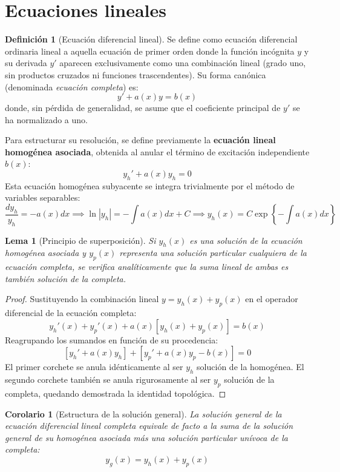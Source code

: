 \documentclass[11pt,a4paper]{article}
\theoremstyle{definition}
\newtheorem{definition}{Definición}[section]
\theoremstyle{plain}
\newtheorem{corollary}{Corolario}[section]
\newtheorem{lemma}{Lema}[section]
\begin{document}
\section{Ecuaciones lineales}

\begin{definition}[Ecuación diferencial lineal]
Se define como ecuación diferencial ordinaria lineal a aquella ecuación de primer orden donde la función incógnita $y$ y su derivada $y'$ aparecen exclusivamente como una combinación lineal (grado uno, sin productos cruzados ni funciones trascendentes). Su forma canónica (denominada \textit{ecuación completa}) es:
$$ y' + a(x)y = b(x) $$
donde, sin pérdida de generalidad, se asume que el coeficiente principal de $y'$ se ha normalizado a uno.
\end{definition}

Para estructurar su resolución, se define previamente la \textbf{ecuación lineal homogénea asociada}, obtenida al anular el término de excitación independiente $b(x)$:
$$ y_h' + a(x)y_h = 0 $$
Esta ecuación homogénea subyacente se integra trivialmente por el método de variables separables:
$$ \frac{dy_h}{y_h} = -a(x)dx \implies \ln|y_h| = -\int a(x)dx + C \implies y_h(x) = C \exp\left\{ -\int a(x)dx \right\} $$

\begin{lemma}[Principio de superposición]
Si $y_h(x)$ es una solución de la ecuación homogénea asociada y $y_p(x)$ representa una solución particular cualquiera de la ecuación completa, se verifica analíticamente que la suma lineal de ambas es también solución de la completa.
\end{lemma}

\begin{proof}
Sustituyendo la combinación lineal $y = y_h(x) + y_p(x)$ en el operador diferencial de la ecuación completa:
$$ y_h'(x) + y_p'(x) + a(x)[y_h(x) + y_p(x)] = b(x) $$
Reagrupando los sumandos en función de su procedencia:
$$ [y_h' + a(x)y_h] + [y_p' + a(x)y_p - b(x)] = 0 $$
El primer corchete se anula idénticamente al ser $y_h$ solución de la homogénea. El segundo corchete también se anula rigurosamente al ser $y_p$ solución de la completa, quedando demostrada la identidad topológica.
\end{proof}

\begin{corollary}[Estructura de la solución general]
La solución general de la ecuación diferencial lineal completa equivale de facto a la suma de la solución general de su homogénea asociada más una solución particular unívoca de la completa:
$$ y_g(x) = y_h(x) + y_p(x) $$
\end{corollary}
\end{document}
